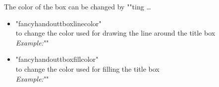 \documentclass[11pt]{ltxdoc}
\begin{document}
	\medskip
	The color of the box can be changed by ""ting …
	\begin{itemize}
		\item "fancyhandouttboxlinecolor" \\
			to change the color used for drawing the line around the title box \\[\smallskipamount]
			\textit{Example:}\quad ""
		
		\item "fancyhandouttboxfillcolor" \\
			to change the color used for filling the title box \\[\smallskipamount]
			\textit{Example:}\quad ""
	\end{itemize}
	
	
\end{document}
